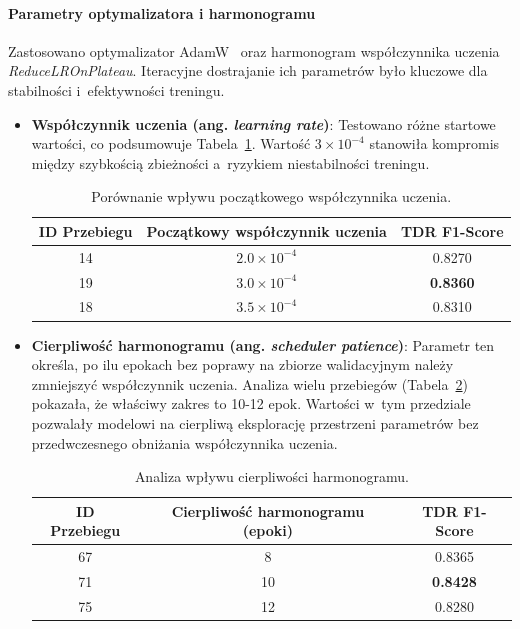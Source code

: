 \paragraph{Parametry optymalizatora i harmonogramu}
Zastosowano optymalizator AdamW~\autocite{Loshchilov2019AdamW} oraz harmonogram współczynnika uczenia \textit{ReduceLROnPlateau}. Iteracyjne dostrajanie ich parametrów było kluczowe dla stabilności i~efektywności treningu.

\begin{itemize}
    \item \textbf{Współczynnik uczenia (ang. \textit{learning rate})}: Testowano różne startowe wartości, co podsumowuje Tabela~\ref{tab:wplyw_lr}. Wartość $3 \times 10^{-4}$ stanowiła kompromis między szybkością zbieżności a~ryzykiem niestabilności treningu.
    
    \begin{table}[H]
    \centering
    \caption{Porównanie wpływu początkowego współczynnika uczenia.}
    \label{tab:wplyw_lr}
    \begin{tabular}{|c|c|c|}
    \hline
    \textbf{ID Przebiegu} & \textbf{Początkowy współczynnik uczenia} & \textbf{TDR F1-Score } \\ \hline
    14 & $2.0 \times 10^{-4}$ & 0.8270 \\ \hline
    19 & $3.0 \times 10^{-4}$ & \textbf{0.8360} \\ \hline
    18 & $3.5 \times 10^{-4}$ & 0.8310 \\ \hline
    \end{tabular}
    \end{table}
    
    \item \textbf{Cierpliwość harmonogramu (ang. \textit{scheduler patience})}: Parametr ten określa, po ilu epokach bez poprawy na zbiorze walidacyjnym należy zmniejszyć współczynnik uczenia. Analiza wielu przebiegów (Tabela~\ref{tab:wplyw_patience}) pokazała, że właściwy zakres to 10-12 epok. Wartości w~tym przedziale pozwalały modelowi na cierpliwą eksplorację przestrzeni parametrów bez przedwczesnego obniżania współczynnika uczenia.
    
    \begin{table}[H]
    \centering
    \caption{Analiza wpływu cierpliwości harmonogramu.}
    \label{tab:wplyw_patience}
    \begin{tabular}{|c|c|c|}
    \hline
    \textbf{ID Przebiegu} & \textbf{Cierpliwość harmonogramu (epoki)} & \textbf{TDR F1-Score } \\ \hline
    67 & 8 & 0.8365 \\ \hline
    71 & 10 & \textbf{0.8428} \\ \hline
    75 & 12 & 0.8280 \\ \hline
    \end{tabular}
    \end{table}
\end{itemize}

